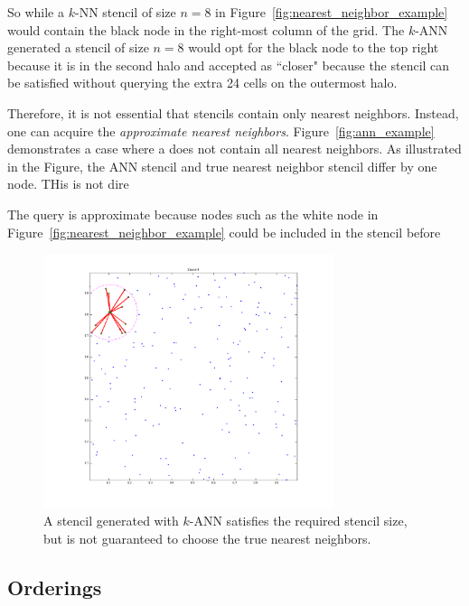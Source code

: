 \documentclass{report}
\begin{document}
So while a $k$-NN stencil of size $n=8$ in Figure~\ref{fig:nearest_neighbor_example} would contain the black node in the right-most column of the grid. The $k$-ANN generated a stencil of size $n=8$ would opt for the black node to the top right because it is in the second halo and accepted as ``closer" because the stencil can be satisfied without querying the extra 24 cells on the outermost halo. 


Therefore, it is not essential that stencils contain only nearest neighbors. Instead, one can acquire the \emph{approximate nearest neighbors}. Figure~\ref{fig:ann_example} demonstrates a case where a does not contain all nearest neighbors. As illustrated in the Figure, the ANN stencil and true nearest neighbor stencil differ by one node. THis is not dire


The query is approximate because nodes such as the white node in Figure~\ref{fig:nearest_neighbor_example} could be included in the stencil before 

\begin{figure}
\centering
\includegraphics[width=8.5cm]{rbffd_methods_content/neighbors/neighbor_incorrect.png}
\caption{A stencil generated with $k$-ANN satisfies the required stencil size, but is not guaranteed to choose the true nearest neighbors.}
\label{fig:approximate_nearest_neighbors}
\end{figure}



\subsection{Orderings}

\end{document}
